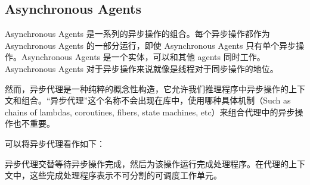 \subsection{Asynchronous Agents}
Asynchronous Agents 是一系列的异步操作的组合。每个异步操作都作为 Asynchronous Agents 的一部分运行，即使 Asynchronous Agents 只有单个异步操作。Asynchronous Agents 是一个实体，可以和其他 agents 同时工作。Asynchronous Agents 对于异步操作来说就像是线程对于同步操作的地位。

然而，异步代理是一种纯粹的概念性构造，它允许我们推理程序中异步操作的上下文和组合。“异步代理”这个名称不会出现在库中，使用哪种具体机制（Such as chains of lambdas, coroutines, fibers, state machines, etc）来组合代理中的异步操作也不重要。

可以将异步代理看作如下：

异步代理交替等待异步操作完成，然后为该操作运行完成处理程序。在代理的上下文中，这些完成处理程序表示不可分割的可调度工作单元。

